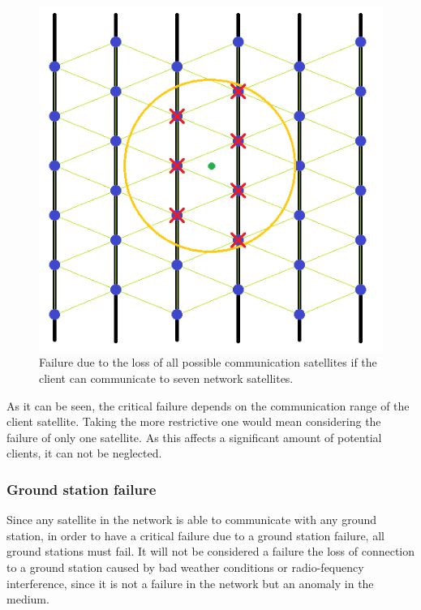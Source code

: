 \begin{figure}[H]
\begin{center}
\includegraphics[scale=0.5]{./sections/Constellation_Deployment/S5-Spare_Strategy/critical3.png}
\caption[7 communication range failure]{Failure due to the loss of all possible communication satellites if the client can communicate to seven network satellites.}
\label{fig:critical3}
\end{center}
\end{figure}

As it can be seen, the critical failure depends on the communication range of the client satellite. Taking the more restrictive one would mean considering the failure of only one satellite. As this affects a significant amount of potential clients, it can not be neglected.

\subsubsection{Ground station failure}
Since any satellite in the network is able to communicate with any ground station, in order to have a critical failure due to a ground station failure, all ground stations must fail. It will not be considered a failure the loss of connection to a ground station caused by bad weather conditions or radio-fequency interference, since it is not a failure in the network but an anomaly in the medium.

